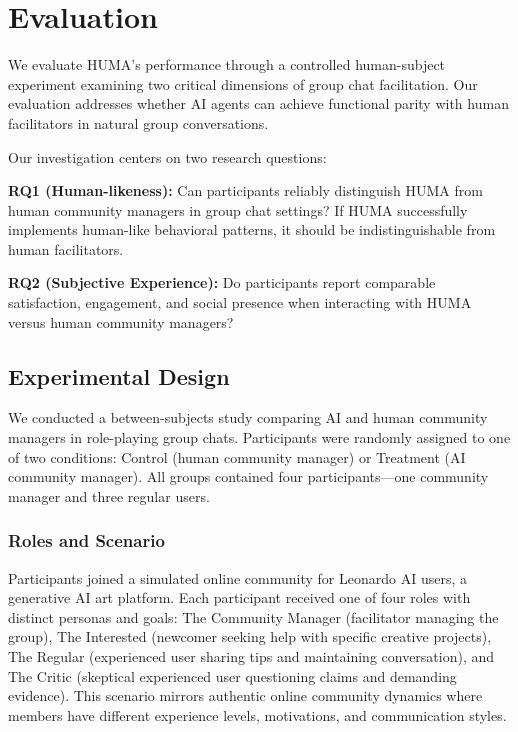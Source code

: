 \documentclass[twocolumn,10pt]{article}
\begin{document}
\section{Evaluation}
\label{sec:results}

We evaluate HUMA's performance through a controlled human-subject experiment examining two critical dimensions of group chat facilitation. Our evaluation addresses whether AI agents can achieve functional parity with human facilitators in natural group conversations.

Our investigation centers on two research questions:

\textbf{RQ1 (Human-likeness):} Can participants reliably distinguish HUMA from human community managers in group chat settings? If HUMA successfully implements human-like behavioral patterns, it should be indistinguishable from human facilitators.

\textbf{RQ2 (Subjective Experience):} Do participants report comparable satisfaction, engagement, and social presence when interacting with HUMA versus human community managers?

\subsection{Experimental Design}

We conducted a between-subjects study comparing AI and human community managers in role-playing group chats. Participants were randomly assigned to one of two conditions: Control (human community manager) or Treatment (AI community manager). All groups contained four participants—one community manager and three regular users.

\subsubsection{Roles and Scenario}

Participants joined a simulated online community for Leonardo AI users, a generative AI art platform. Each participant received one of four roles with distinct personas and goals: The Community Manager (facilitator managing the group), The Interested (newcomer seeking help with specific creative projects), The Regular (experienced user sharing tips and maintaining conversation), and The Critic (skeptical experienced user questioning claims and demanding evidence). This scenario mirrors authentic online community dynamics where members have different experience levels, motivations, and communication styles.
\end{document}
